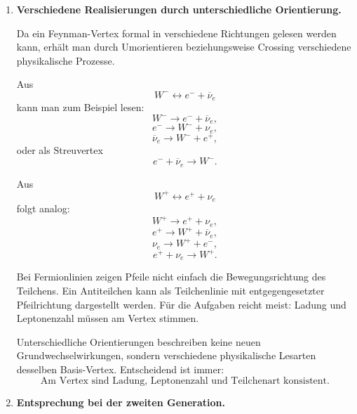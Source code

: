 \documentclass[11pt,a4paper]{scrartcl}
\theoremstyle{definition}
\theoremstyle{plain}
\theoremstyle{remark}
\begin{document}
\begin{enumerate}[label=(\alph*)]
    \item \textbf{Verschiedene Realisierungen durch unterschiedliche Orientierung.}

    \begin{calculationbox}
        Da ein Feynman-Vertex formal in verschiedene Richtungen gelesen werden kann, erhält man durch Umorientieren beziehungsweise Crossing verschiedene physikalische Prozesse.

        Aus
        \[
            W^- \leftrightarrow e^-+\overline{\nu}_e
        \]
        kann man zum Beispiel lesen:
        \[
            W^- \to e^-+\overline{\nu}_e,
        \]
        \[
            e^- \to W^-+\nu_e,
        \]
        \[
            \overline{\nu}_e \to W^-+e^+,
        \]
        oder als Streuvertex
        \[
            e^-+\overline{\nu}_e \to W^-.
        \]

        Aus
        \[
            W^+ \leftrightarrow e^+ + \nu_e
        \]
        folgt analog:
        \[
            W^+ \to e^+ + \nu_e,
        \]
        \[
            e^+ \to W^+ + \overline{\nu}_e,
        \]
        \[
            \nu_e \to W^+ + e^-,
        \]
        \[
            e^+ + \nu_e \to W^+.
        \]
    \end{calculationbox}

    \begin{warningbox}[title=Pfeilrichtungen richtig lesen]
        Bei Fermionlinien zeigen Pfeile nicht einfach die Bewegungsrichtung des Teilchens. Ein Antiteilchen kann als Teilchenlinie mit entgegengesetzter Pfeilrichtung dargestellt werden. Für die Aufgaben reicht meist: Ladung und Leptonenzahl müssen am Vertex stimmen.
    \end{warningbox}

    \begin{answerbox}
        Unterschiedliche Orientierungen beschreiben keine neuen Grundwechselwirkungen, sondern verschiedene physikalische Lesarten desselben Basis-Vertex. Entscheidend ist immer:
        \[
            \boxed{\text{Am Vertex sind Ladung, Leptonenzahl und Teilchenart konsistent.}}
        \]
    \end{answerbox}

    \item \textbf{Entsprechung bei der zweiten Generation.}


\end{enumerate}
\end{document}
